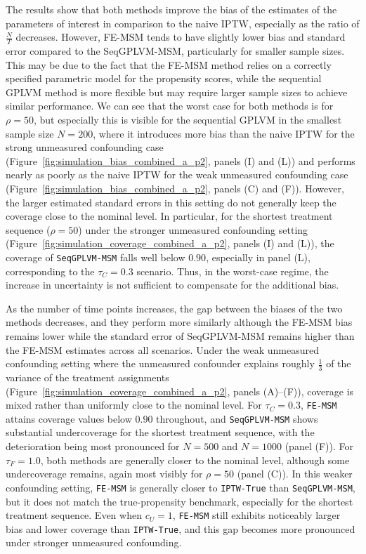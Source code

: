 The results show that both methods improve the bias of the estimates of the 
parameters of interest in comparison to the naive IPTW, especially as the ratio of 
$\frac{N}{T}$ decreases. However, FE-MSM tends to have slightly lower bias and 
standard error compared to the SeqGPLVM-MSM, particularly for smaller sample sizes. 
This may be due to the fact that the FE-MSM method relies on a correctly specified 
parametric model for the propensity scores, while the sequential GPLVM method is more 
flexible but may require larger sample sizes to achieve similar performance. We can see that 
the worst case for both methods is for $\rho = 50$, but especially this is visible for 
the sequential GPLVM in the smallest sample size $N = 200$, where it introduces 
more bias than the naive IPTW for the strong unmeasured confounding case 
(Figure~\ref{fig:simulation_bias_combined_a_p2}, panels (I) and (L)) 
and performs nearly as poorly as the naive IPTW for the weak unmeasured confounding 
case (Figure~\ref{fig:simulation_bias_combined_a_p2}, panels (C) and (F)). However, 
the larger estimated standard errors in this setting do not generally keep the coverage 
close to the nominal level. In particular, for the shortest treatment sequence 
($\rho = 50$) under the stronger unmeasured confounding setting 
(Figure~\ref{fig:simulation_coverage_combined_a_p2}, panels (I) and (L)), the coverage of 
\texttt{SeqGPLVM-MSM} falls well below $0.90$, 
especially in panel (L), corresponding to the $\tau_C = 0.3$ scenario. Thus, 
in the worst-case regime, the increase in uncertainty is not sufficient to 
compensate for the additional bias.

As the number of time points increases, the gap between the biases of the two methods decreases, and 
they perform more similarly although the FE-MSM bias remains lower while the standard 
error of SeqGPLVM-MSM remains higher than the FE-MSM estimates across all scenarios. 
Under the weak unmeasured confounding setting where the unmeasured confounder explains 
roughly $\frac{1}{3}$ of the variance of the treatment assignments (Figure~\ref{fig:simulation_coverage_combined_a_p2}, panels (A)--(F)), coverage is mixed 
rather than uniformly close to the nominal level. For $\tau_C = 0.3$, \texttt{FE-MSM} 
attains coverage values below $0.90$ throughout, and \texttt{SeqGPLVM-MSM} 
shows substantial undercoverage for the shortest treatment sequence, 
with the deterioration being most pronounced for $N = 500$ and $N = 1000$ (panel (F)). 
For $\tau_F = 1.0$, both methods are generally closer to the nominal level, 
although some undercoverage remains, again most visibly for $\rho = 50$ (panel (C)). 
In this weaker confounding setting, \texttt{FE-MSM} is generally 
closer to \texttt{IPTW-True} than \texttt{SeqGPLVM-MSM}, 
but it does not match the true-propensity benchmark, especially for the 
shortest treatment sequence. Even when $c_U = 1$, \texttt{FE-MSM} 
still exhibits noticeably larger bias and lower coverage than \texttt{IPTW-True}, 
and this gap becomes more pronounced under stronger unmeasured confounding. 

